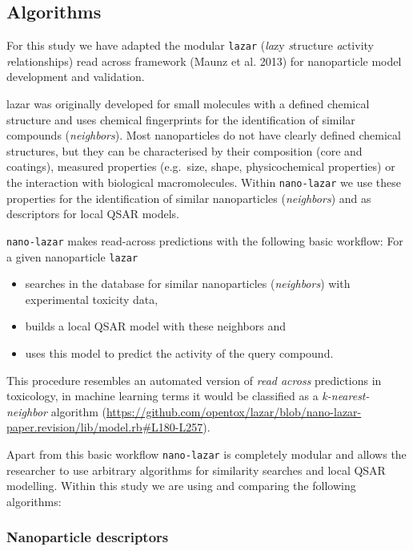 \documentclass[utf8]{frontiersHLTH} %
\providecommand{\tightlist}{%
  \setlength{\itemsep}{0pt}\setlength{\parskip}{0pt}}
\begin{document}
\subsection{Algorithms}\label{algorithms}

For this study we have adapted the modular \texttt{lazar} (\emph{la}zy
\emph{s}tructure \emph{a}ctivity \emph{r}elationships) read across
framework (Maunz et al. 2013) for nanoparticle model development and
validation.

lazar was originally developed for small molecules with a defined
chemical structure and uses chemical fingerprints for the identification
of similar compounds (\emph{neighbors}). Most nanoparticles do not have
clearly defined chemical structures, but they can be characterised by
their composition (core and coatings), measured properties (e.g.~size,
shape, physicochemical properties) or the interaction with biological
macromolecules. Within \texttt{nano-lazar} we use these properties for
the identification of similar nanoparticles (\emph{neighbors}) and as
descriptors for local QSAR models.

\texttt{nano-lazar} makes read-across predictions with the following
basic workflow: For a given nanoparticle \texttt{lazar}

\begin{itemize}
\tightlist
\item
  searches in the database for similar nanoparticles (\emph{neighbors})
  with experimental toxicity data,
\item
  builds a local QSAR model with these neighbors and
\item
  uses this model to predict the activity of the query compound.
\end{itemize}

This procedure resembles an automated version of \emph{read across}
predictions in toxicology, in machine learning terms it would be
classified as a \emph{k-nearest-neighbor} algorithm
(\url{https://github.com/opentox/lazar/blob/nano-lazar-paper.revision/lib/model.rb\#L180-L257}).

Apart from this basic workflow \texttt{nano-lazar} is completely modular
and allows the researcher to use arbitrary algorithms for similarity
searches and local QSAR modelling. Within this study we are using and
comparing the following algorithms:

\subsubsection{Nanoparticle descriptors}\label{nanoparticle-descriptors}
\end{document}
